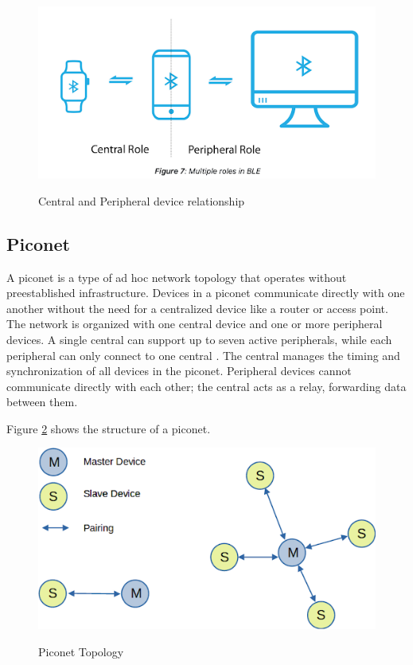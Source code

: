\begin{figure}[h]
    \caption{Central and Peripheral device relationship}
    \includegraphics[scale=.7]{centralperipheral.png}
    \label{fig:centralperipheral}
    \end{figure}

\subsection{Piconet}

A piconet is a type of ad hoc network topology that operates without preestablished infrastructure. Devices in a piconet communicate directly with one another without the need for a centralized device like a router or access point. The network is organized with one central device and one or more peripheral devices. A single central can support up to seven active peripherals, while each peripheral can only connect to one central \cite{nextgenBLE}. The central manages the timing and synchronization of all devices in the piconet. Peripheral devices cannot communicate directly with each other; the central acts as a relay, forwarding data between them.

Figure \ref{fig:piconet} shows the structure of a piconet.

\begin{figure}[h]
    \caption{Piconet Topology}
    \includegraphics[scale=.7]{piconet.png}
    \label{fig:piconet}
    \end{figure}

